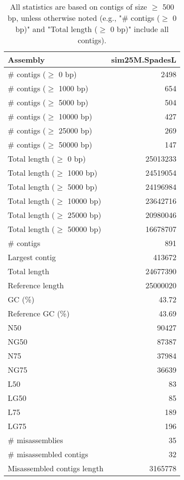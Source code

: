 \documentclass[12pt,a4paper]{article}
\begin{document}
\begin{table}[ht]
\begin{center}
\caption{All statistics are based on contigs of size $\geq$ 500 bp, unless otherwise noted (e.g., "\# contigs ($\geq$ 0 bp)" and "Total length ($\geq$ 0 bp)" include all contigs).}
\begin{tabular}{|l*{1}{|r}|}
\hline
Assembly & sim25M.SpadesL \\ \hline
\# contigs ($\geq$ 0 bp) & 2498 \\ \hline
\# contigs ($\geq$ 1000 bp) & 654 \\ \hline
\# contigs ($\geq$ 5000 bp) & 504 \\ \hline
\# contigs ($\geq$ 10000 bp) & 427 \\ \hline
\# contigs ($\geq$ 25000 bp) & 269 \\ \hline
\# contigs ($\geq$ 50000 bp) & 147 \\ \hline
Total length ($\geq$ 0 bp) & 25013233 \\ \hline
Total length ($\geq$ 1000 bp) & 24519054 \\ \hline
Total length ($\geq$ 5000 bp) & 24196984 \\ \hline
Total length ($\geq$ 10000 bp) & 23642716 \\ \hline
Total length ($\geq$ 25000 bp) & 20980046 \\ \hline
Total length ($\geq$ 50000 bp) & 16678707 \\ \hline
\# contigs & 891 \\ \hline
Largest contig & 413672 \\ \hline
Total length & 24677390 \\ \hline
Reference length & 25000020 \\ \hline
GC (\%) & 43.72 \\ \hline
Reference GC (\%) & 43.69 \\ \hline
N50 & 90427 \\ \hline
NG50 & 87387 \\ \hline
N75 & 37984 \\ \hline
NG75 & 36639 \\ \hline
L50 & 83 \\ \hline
LG50 & 85 \\ \hline
L75 & 189 \\ \hline
LG75 & 196 \\ \hline
\# misassemblies & 35 \\ \hline
\# misassembled contigs & 32 \\ \hline
Misassembled contigs length & 3165778 \\ \hline

\end{tabular}
\end{center}
\end{table}
\end{document}
